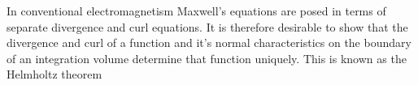 %
%
In conventional electromagnetism Maxwell's equations are posed in terms of separate divergence and curl equations.  It is therefore desirable to show that the divergence and curl of a function and it's normal characteristics on the boundary of an integration volume determine that function uniquely.  This is known as the Helmholtz theorem

